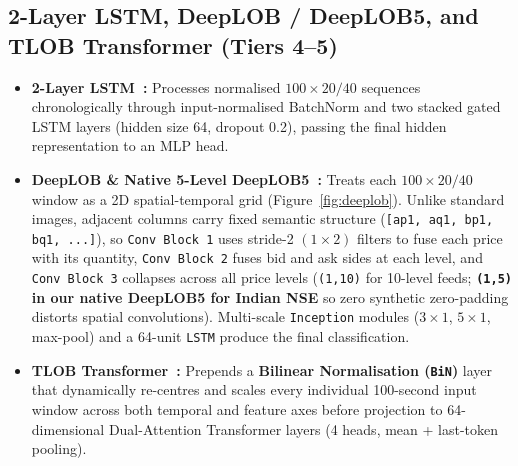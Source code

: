 \documentclass[12pt,a4paper,oneside]{report}
\newcommand{\code}[1]{\texttt{#1}}
\begin{document}
\subsection{2-Layer LSTM, DeepLOB / DeepLOB5, and TLOB Transformer (Tiers 4--5)}
\begin{itemize}
  \item \textbf{2-Layer LSTM~\cite{hochreiter1997}:} Processes normalised $100 \times 20/40$ sequences chronologically through input-normalised BatchNorm and two stacked gated LSTM layers (hidden size 64, dropout 0.2), passing the final hidden representation to an MLP head.
  \item \textbf{DeepLOB \& Native 5-Level DeepLOB5~\cite{zhang2019}:} Treats each $100 \times 20/40$ window as a 2D spatial-temporal grid (Figure~\ref{fig:deeplob}). Unlike standard images, adjacent columns carry fixed semantic structure (\code{[ap1, aq1, bp1, bq1, ...]}), so \code{Conv Block 1} uses stride-2 $(1{\times}2)$ filters to fuse each price with its quantity, \code{Conv Block 2} fuses bid and ask sides at each level, and \code{Conv Block 3} collapses across all price levels (\code{(1,10)} for 10-level feeds; \textbf{\code{(1,5)} in our native DeepLOB5 for Indian NSE} so zero synthetic zero-padding distorts spatial convolutions). Multi-scale \code{Inception} modules ($3{\times}1$, $5{\times}1$, max-pool) and a 64-unit \code{LSTM} produce the final classification.
  \item \textbf{TLOB Transformer~\cite{berti2025,tran2021,vaswani2017}:} Prepends a \textbf{Bilinear Normalisation (\code{BiN})} layer that dynamically re-centres and scales every individual 100-second input window across both temporal and feature axes before projection to 64-dimensional Dual-Attention Transformer layers (4 heads, mean + last-token pooling).
\end{itemize}
\end{document}
